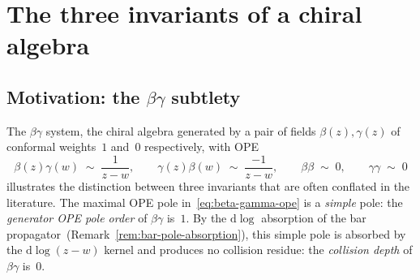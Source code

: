 \chapter{The three invariants of a chiral algebra}
\label{ch:three-invariants}

\begin{abstract}
Three distinct numerical invariants of a chiral algebra~$\cA$
(the \emph{generator OPE pole order}~$p_{\max}(\cA)$, the
\emph{collision depth}~$k_{\max}(\cA)$, and the
\emph{shadow depth}~$r_{\max}(\cA)$) measure three different
structural features and need not coincide. This chapter formalizes
the distinction, states the relation
$k_{\max} = p_{\max} - 1$ on the fixed minimal-generator lane of the
standard landscape
(a consequence of the $\mathrm{d}\log$ absorption of the bar
propagator), and proves that $r_{\max}$ is independent
of $p_{\max}$. The $\beta\gamma$ system is the archetypal witness:
$p_{\max} = 1$, $k_{\max} = 0$, $r_{\max} = 4$.
The same separation fences these three finite pole/shadow invariants
from the scalar characteristic~$\kappa$, from the derived chiral
centre $\ChirHoch^\bullet(\cA,\cA)$, and from the bar--cobar
Koszul package.
This distinction is load-bearing for the operator-order trichotomy
of Theorem~\ref{thm:shadow-depth-operator-order}, for the
classification of the standard landscape into the four
classes~$G,L,C,M$, and for the universal-conductor
identification
(Chapter~\ref{chap:universal-conductor},
$K(\cA) = -c_{\mathrm{ghost}}(\mathrm{BRST}(\cA))$): the
shadow-depth invariant $r_{\max}$ stratifies the conductor's
domain, while $p_{\max}$ and $k_{\max}$ control the OPE-side
input data. The shadow quadrichotomy
(Chapter~\ref{chap:shadow-quadrichotomy-platonic}) reads the
$r_{\max} \in \{2, 3, 4, \infty\}$ values as the Riccati strata
$G/L/C/M$.
\end{abstract}

\section{Motivation: the \texorpdfstring{$\beta\gamma$}{beta-gamma} subtlety}
\label{sec:three-invariants-motivation}

The $\beta\gamma$ system, the chiral algebra generated by a pair
of fields $\beta(z),\gamma(z)$ of conformal weights~$1$ and~$0$
respectively, with OPE
\begin{equation}\label{eq:beta-gamma-ope}
\beta(z)\gamma(w) \;\sim\; \frac{1}{z-w},
\qquad
\gamma(z)\beta(w) \;\sim\; \frac{-1}{z-w},
\qquad
\beta\beta \;\sim\; 0,
\qquad
\gamma\gamma \;\sim\; 0
\end{equation}
illustrates the distinction between three invariants that are
often conflated in the literature. The maximal OPE pole
in~\eqref{eq:beta-gamma-ope} is a \emph{simple} pole: the
\emph{generator OPE pole order} of $\beta\gamma$ is~$1$. By the
$\mathrm{d}\log$ absorption of the bar
propagator~(Remark~\textup{\ref{rem:bar-pole-absorption}}), this
simple pole is absorbed by the $\mathrm{d}\log(z-w)$ kernel and
produces no collision residue: the \emph{collision depth} of
$\beta\gamma$ is~$0$.

